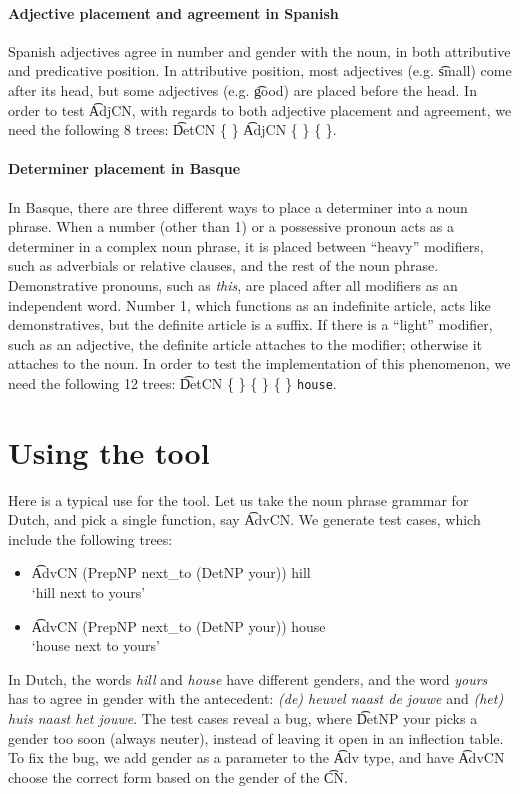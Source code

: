 \paragraph{Adjective placement and agreement in Spanish}
Spanish adjectives agree in number and gender with the noun, in both
attributive and predicative position. In attributive position, most
adjectives (e.g. \t{small}) come after its head, but some adjectives
(e.g. \t{good}) are placed before the head. 
In order to test \t{AdjCN}, with regards to both adjective placement
and agreement, we need the following 8 trees: 
\t{DetCN}  \{  \}
 \t{AdjCN} \{  \} 
           \{  \}.

\paragraph{Determiner placement in Basque} In Basque, there are three
different ways to place a determiner into a noun phrase. When a number
(other than 1) or a possessive pronoun acts as a determiner in a
complex noun phrase, it is placed between ``heavy'' modifiers, such as
adverbials or relative clauses, and the rest of the noun
phrase. Demonstrative pronouns, such as \emph{this}, are placed after
all modifiers as an independent word. Number 1, which functions as an
indefinite article, acts like demonstratives, but the definite article
is a suffix. If there is a ``light'' modifier, such as an adjective,
the definite article attaches to the modifier; otherwise it attaches
to the noun. In order to test the implementation of this phenomenon,
we need the following 12 trees: 
\t{DetCN} \{
\} \{  \} 
\{  \}  {\tt house}.


\section{Using the tool}

Here is a typical use for the tool. Let us take the noun phrase
grammar for Dutch, and pick a single function, say \t{AdvCN}. We
generate test cases, which include the following trees:
\begin{itemize}
\item[] \t{AdvCN (PrepNP next\_to (DetNP your)) hill} \\
`hill next to yours'
\item[] \t{AdvCN (PrepNP next\_to (DetNP your)) house} \\ `house next
to yours'
\end{itemize}
In Dutch, the words \emph{hill} and \emph{house} have different
genders, and the word \emph{yours} has to agree in gender with the
antecedent: \emph{(de) heuvel naast de jouwe} and \emph{(het) huis
  naast het jouwe}. The test cases reveal a bug, where \t{DetNP your}
picks a gender too soon (always neuter), instead of leaving it open in
an inflection table. To fix the bug, we add gender as a parameter to
the \t{Adv} type, and have \t{AdvCN} choose the correct form based on
the gender of the \t{CN}.

